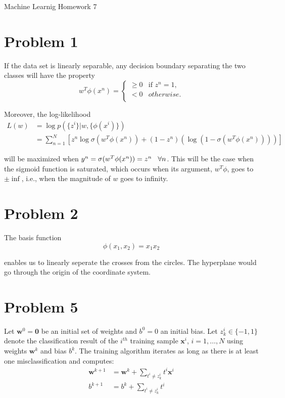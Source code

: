 \documentclass[12pt]{article}
\begin{document}
\begin{center}
{\Large Machine Learnig Homework 7} \\[.3in]
\end{center}
\vspace*{.5in}

\section*{Problem 1}
If the data set is linearly separable, any decision boundary separating the two classes will have the property
\begin{equation}
w^T\phi(x^n) = \begin{cases} \geq 0 & \mbox{if } z^n = 1, \\ < 0 & otherwise. \\ \end{cases}
\label{eq:}
\end{equation}

Moreover, the log-likelihood 
\begin{align}
L(w) &= \log p(\{z^i\}|w,\{\phi(x^i)\})\\
&= \sum^{N}_{n = 1}\left[z^n\log \sigma(w^T\phi(x^n)) + (1-z^n)(\log(1-\sigma(w^T\phi(x^n))))\right]
\end{align}

will be maximized when $y^n = \sigma(w^T\phi(x^n)) = z^n \hspace{0.3cm}\forall n$. This will be the case when the sigmoid function is saturated, which occurs when its argument, $w^T\phi$, goes to $\pm \inf$, i.e., when the magnitude of $w$ goes to infinity. 


\section*{Problem 2}
The basis function 
\begin{equation}
\phi(x_1,x_2) = x_1x_2
\end{equation}

enables us to linearly seperate the crosses from the circles. The hyperplane would go through the origin of the coordinate system.

\section*{Problem 5}

Let $\mathbf{w}^0 = \mathbf{0}$ be an initial set of weights and $b^0 = 0$ an initial bias. Let $z_k^i \in \{-1, 1\}$ denote the classification result of the $i^{th}$ training sample $\mathbf{x}^i$, $i = 1, \ldots, N$ using weights $\mathbf{w}^k$ and bias $b^k$. The training algorithm iterates as long as there is at least one misclassification and computes:
\begin{equation}
\begin{align}
  \mathbf{w}^{k+1} &= \mathbf{w}^k + \sum_{t^i \neq z_k^i} t^i \mathbf{x}^i \\
  b^{k+1} &= b^k + \sum_{t^i \neq z_k^i} t^i
\end{align}
\label{eq:train}
\end{equation}
\end{document}
